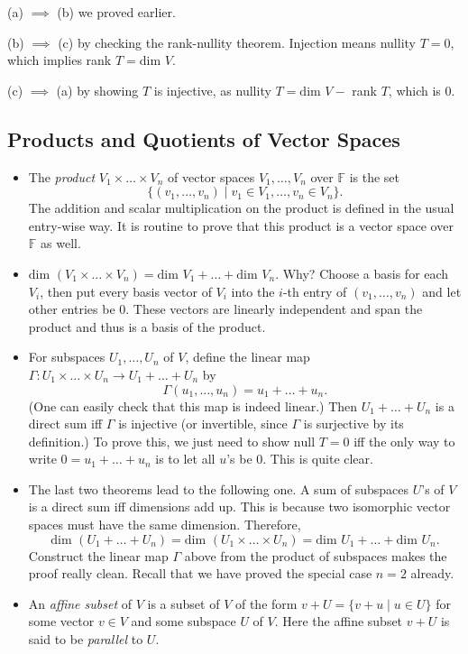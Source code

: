 \documentclass{article}
\newcommand{\F}{\mathbb{F}}
\newcommand{\n}{\text{null }}
\renewcommand{\d}{\text{dim }}
\begin{document}
\begin{itemize}
    (a) $\implies$ (b) we proved earlier.
        
    (b) $\implies$ (c) by checking the rank-nullity theorem. Injection means nullity $T = 0$, which implies rank $T = \d V$.
        
    (c) $\implies$ (a) by showing $T$ is injective, as nullity $T = \d V - $ rank $T$, which is 0.
\end{itemize}

\subsection{Products and Quotients of Vector Spaces}
\begin{itemize}
    \item The \textit{product} $V_1 \times \dots \times V_n$ of vector spaces $V_1,\dots,V_n$ over $\F$ is the set $$\{(v_1,\dots,v_n) \mid v_1 \in V_1,\dots, v_n \in V_n\}.$$ The addition and scalar multiplication on the product is defined in the usual entry-wise way. It is routine to prove that this product is a vector space over $\F$ as well.
    \item $\d (V_1\times \dots \times V_n) = \d V_1 + \dots + \d V_n$. Why? Choose a basis for each $V_i$, then put every basis vector of $V_i$ into the $i$-th entry of $(v_1,\dots,v_n)$ and let other entries be 0. These vectors are linearly independent and span the product and thus is a basis of the product.
    \item For subspaces $U_1,\dots,U_n$ of $V$, define the linear map $\Gamma: U_1 \times \dots \times U_n \to U_1 + \dots + U_n$ by $$\Gamma(u_1,\dots,u_n) = u_1+\dots+u_n.$$ (One can easily check that this map is indeed linear.) Then $U_1+\dots+U_n$ is a direct sum iff $\Gamma$ is injective (or invertible, since $\Gamma$ is surjective by its definition.) To prove this, we just need to show $\n T = {0}$ iff the only way to write $0 = u_1+\dots+u_n$ is to let all $u$'s be 0. This is quite clear.
    \item The last two theorems lead to the following one. A sum of subspaces $U$'s of $V$ is a direct sum iff dimensions add up. This is because two isomorphic vector spaces must have the same dimension. Therefore, $$\d (U_1+\dots+U_n) = \d (U_1 \times \dots \times U_n) = \d U_1 + \dots + \d U_n.$$
    Construct the linear map $\Gamma$ above from the product of subspaces makes the proof really clean. Recall that we have proved the special case $n=2$ already.
    \item An \textit{affine subset} of $V$ is a subset of $V$ of the form $v+U = \{v+u \mid u \in U\}$ for some vector $v \in V$ and some subspace $U$ of $V$. Here the affine subset $v+U$ is said to be \textit{parallel} to $U$.

\end{itemize}
\end{document}
